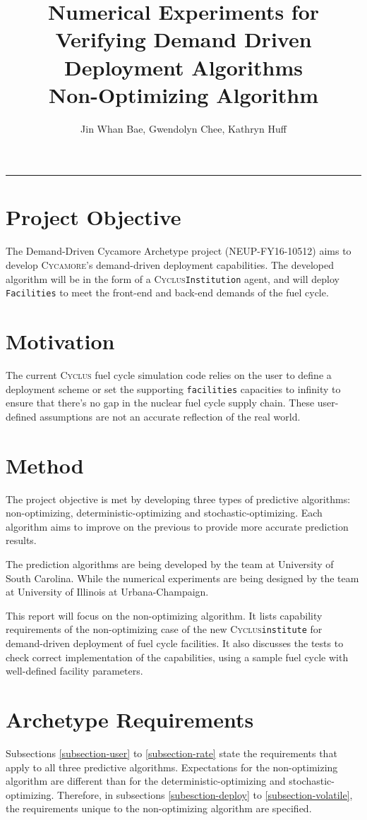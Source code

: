 \documentclass[11pt,letterpaper]{article}
\title{Numerical Experiments for Verifying Demand Driven Deployment Algorithms 
        \\ \vspace{0.5em} Non-Optimizing Algorithm}
\author{Jin Whan Bae, Gwendolyn Chee, Kathryn Huff}
\newcommand{\Cyclus}{\textsc{Cyclus}\xspace}%
\newcommand{\Cycamore}{\textsc{Cycamore}\xspace}%
\begin{document}
	\maketitle
	\hrule

\section{Project Objective}
The Demand-Driven Cycamore Archetype project (NEUP-FY16-10512) aims to develop \Cycamore's demand-driven deployment capabilities. The developed algorithm will be in the form of a \Cyclus \texttt{Institution} agent, and will deploy \texttt{Facilities} to meet the front-end and back-end demands of the fuel cycle.

\section{Motivation}
The current \Cyclus fuel cycle simulation code relies on the user to define
a deployment scheme or set the supporting \texttt{facilities} capacities to infinity
to ensure that there's no gap in the nuclear fuel cycle supply chain. These user-defined assumptions 
are not an accurate reflection of the real world. 

\section{Method}
The project objective is met by developing three types of predictive algorithms: non-optimizing, deterministic-optimizing and stochastic-optimizing. Each algorithm aims to improve on the previous 
to provide more accurate prediction results.  

The prediction algorithms are being developed by the team at University of South Carolina. While the numerical experiments are being designed by the team at University of Illinois at Urbana-Champaign.

This report will focus on the non-optimizing algorithm. 
It lists capability requirements of the non-optimizing case of the new \Cyclus \texttt{institute}
for demand-driven deployment of fuel cycle facilities. 
It also discusses the tests to check correct implementation of the capabilities,
using a sample fuel cycle with well-defined facility parameters.

\section{Archetype Requirements}
Subsections \ref{subsection-user} to \ref{subsection-rate} state the requirements that apply to all three predictive algorithms. Expectations for the non-optimizing algorithm are different than for the deterministic-optimizing and stochastic-optimizing. Therefore, in subsections \ref{subesction-deploy} to \ref{subsection-volatile}, the requirements unique to the non-optimizing algorithm are specified. 
\end{document}
